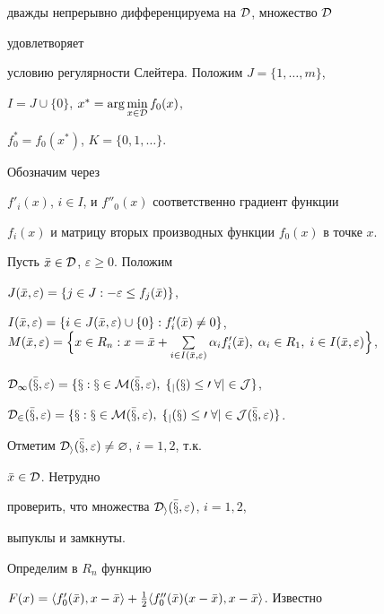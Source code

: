 дважды непрерывно дифференцируема на $\cal D$, множество $\cal D$


удовлетворяет


условию регулярности Слейтера. Положим $J=\{1,\dotsc,m\}$,


$I=J\cup\{0\}$, $x^*=\arg\min\limits_{x\in\cal D}f_0(x)$,


$f^*_0=f_0(x^*)$, $K=\{0,1,\dotsc\}$.


Обозначим через


$f'_i(x)$, $i\in I$, и $f''_0(x)$ соответственно градиент функции


$f_i(x)$ и матрицу вторых производных функции $f_0(x)$ в точке $x$.





Пусть $\Bar x\in\cal D$, $\varepsilon\ge 0$. Положим


$J(\Bar x,\varepsilon)=\{j\in J:-\varepsilon\le f_j(\Bar x)\}$,


$I(\Bar x,\varepsilon)=\{i\in J(\Bar x,\varepsilon)\cup\{0\}:f'_i(\Bar


x)\ne 0\}$, $M(\Bar x,\varepsilon)=\Bigl\{x\in R_n:x=\Bar x+


\sum\limits_{i\in I(\Bar x,\varepsilon)}\alpha_if'_i(\Bar x),\;


\alpha_i\in R_1,\;i\in I(\Bar x,\varepsilon)\Bigr\}$,


$\cal D_1(\Bar x,\varepsilon)=\{x:x\in M(\Bar x,\varepsilon),\;


f_j(x)\le 0\;\forall j\in J\}$,


$\cal D_2(\Bar x,\varepsilon)=\{x:x\in M(\Bar x,


\varepsilon),\;


f_j(x)\le 0\;\forall j\in J(\Bar x,\varepsilon)\}$.





Отметим $\cal D_i(\Bar x,\varepsilon)\ne \varnothing$, $i=1,2$, т.к.


$\Bar x\in\cal D$. Нетрудно


проверить, что множества $\cal D_i(\Bar x,\varepsilon)$, $i=1,2$,


выпуклы и замкнуты.





Определим в $R_n$ функцию


$F(x)=\la f'_0(\Bar x),x-\Bar x\ra+\frac{1}{2}\la f''_0(\Bar x)


(x-\Bar x),x-\Bar x\ra$. Известно


